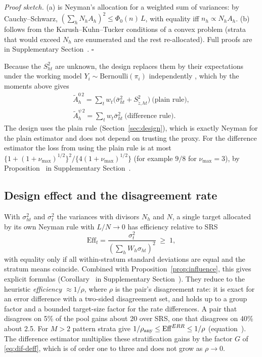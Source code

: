 \emph{Proof sketch.} (a) is Neyman's allocation \citep{neyman1934} for a weighted sum of variances: by Cauchy--Schwarz,
$(\sum_hN_hA_h)^2\le\Phi_0(n)\,L$, with equality iff $n_h\propto N_hA_h$. (b) follows from the Karush--Kuhn--Tucker conditions of a convex
problem (strata that would exceed $N_h$ are enumerated and the rest re-allocated). Full proofs are in Supplementary Section~. $\square$

Because the $S^2_{ht}$ are unknown, the design replaces them by their expectations under the working model $Y_i\sim\text{Bernoulli}(\pi_i)$ independently
\citep[the anticipated variance of][]{isaki1982}, which by the moments above gives
\begin{equation}\label{eq:anticipated}
\begin{gathered}
\tilde A^{0\,2}_h=\sum_tw_t\big(\bar\sigma^2_{ht}+S^2_{\tilde z,ht}\big)\ \text{(plain rule)},\\
\tilde A^{\psi\,2}_h=\sum_tw_t\bar\sigma^2_{ht}\ \text{(difference rule)}.
\end{gathered}
\end{equation}
The design uses the plain rule (Section~\ref{sec:design}), which is exactly Neyman for the plain estimator and does not depend on trusting the proxy. For the difference
estimator the loss from using the plain rule is at most $\{1+(1+\nu_{\max})^{1/2}\}^2/\{4(1+\nu_{\max})^{1/2}\}$ (for example $9/8$ for $\nu_{\max}=3$),
by Proposition~ in Supplementary Section~.

\subsection{Design effect and the disagreement rate}\label{sec:theory-deff}

With $\sigma^2_{ht}$ and $\sigma^2_t$ the variances with divisors $N_h$ and $N$, a single target allocated by its own Neyman rule with $L/N\to0$ has efficiency relative to SRS
\begin{equation}\label{eq:deff-general}
\mathrm{Eff}_t=\frac{\sigma_t^2}{(\sum_hW_h\sigma_{ht})^2}\;\ge\;1,
\end{equation}
with equality only if all within-stratum standard deviations are equal and the stratum means coincide. Combined with Proposition~\ref{prop:influence}, this gives explicit
formulas (Corollary~ in Supplementary Section~). They reduce to the heuristic \emph{efficiency $\approx1/\rho$}, where $\rho$ is the pair's
disagreement rate: it is exact for an error difference with a two-sided disagreement set, and holds up to a group factor and a bounded target-size factor for the rate differences. A pair that disagrees on 5\% of the
pool gains about 20 over SRS, one that disagrees on 40\% about 2.5. For $M>2$ pattern strata give $1/\rho_{\rm any}\le\mathrm{Eff}^{ERR}\le1/\rho$ (equation~). The difference estimator multiplies these stratification gains by the factor $G$ of
\eqref{eq:dif-deff}, which is of order one to three and does not grow as $\rho\to0$.

